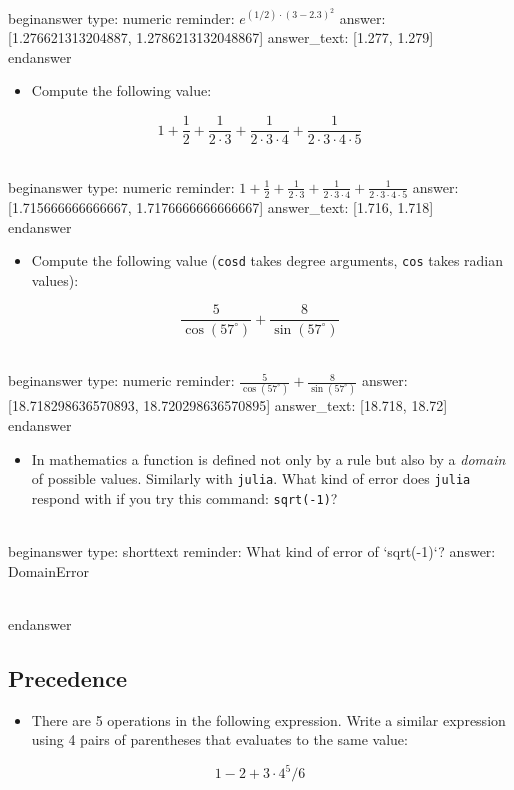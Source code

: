 \documentclass[12pt]{article}
\begin{document}
\\begin{answer}
    type: numeric
    reminder: \( e^{(1/2)\cdot(3 - 2.3)^2} \)
    answer: [1.276621313204887, 1.2786213132048867]
    answer_text: [1.277, 1.279] 
\\end{answer}
\begin{itemize}\item Compute the following value:\end{itemize}
$$
1 + \frac{1}{2} + \frac{1}{2\cdot 3} + \frac{1}{2\cdot 3\cdot4} + \frac{1}{2\cdot 3\cdot4\cdot5}
$$

\\begin{answer}
    type: numeric
    reminder: \(1 + \frac{1}{2} + \frac{1}{2\cdot 3} + \frac{1}{2\cdot 3\cdot4} + \frac{1}{2\cdot 3\cdot4\cdot5}\)
    answer: [1.715666666666667, 1.7176666666666667]
    answer_text: [1.716, 1.718] 
\\end{answer}
\begin{itemize}\item Compute the following value (\texttt{cosd} takes degree arguments, \texttt{cos} takes radian values):\end{itemize}
$$
\frac{5}{\cos(57^\circ)}  + \frac{8}{\sin(57^\circ)}
$$

\\begin{answer}
    type: numeric
    reminder: \( \frac{5}{\cos(57^\circ)}  + \frac{8}{\sin(57^\circ)} \)
    answer: [18.718298636570893, 18.720298636570895]
    answer_text: [18.718, 18.72] 
\\end{answer}
\begin{itemize}\item In mathematics a function is defined not only by a rule but also by   a \textit{domain} of possible values. Similarly with \texttt{julia}. What kind of   error does \texttt{julia} respond with if you try this command: \texttt{sqrt(-1)}?\end{itemize}
\\begin{answer}
type: shorttext
reminder: What kind of error of `sqrt(-1)`?
answer: DomainError

\\end{answer}
\subsection{Precedence}\begin{itemize}\item There are 5 operations in the following expression. Write a similar   expression using 4 pairs of parentheses that evaluates to the same   value:\end{itemize}
$$
1 - 2 + 3 \cdot 4 ^ 5 / 6
$$
\end{document}
